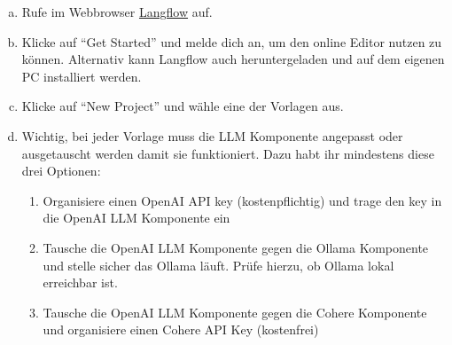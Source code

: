 \documentclass[12pt,ngerman]{AssignmentClass}
\begin{document}
\begin{enumerate}[a)]

\item Rufe im Webbrowser \href{https://www.langflow.org/}{Langflow} auf. 

\item Klicke auf “Get Started” und melde dich an, um den online Editor nutzen zu können. Alternativ kann Langflow auch heruntergeladen und auf dem eigenen PC installiert werden.    

\item Klicke auf “New Project” und wähle eine der Vorlagen aus. 

\item Wichtig, bei jeder Vorlage muss die LLM Komponente angepasst oder ausgetauscht werden damit sie funktioniert. Dazu habt ihr mindestens diese drei Optionen: 
\begin{enumerate}
    \item Organisiere einen OpenAI API key (kostenpflichtig) und trage den key in die OpenAI LLM Komponente ein
    \item Tausche die OpenAI LLM Komponente gegen die Ollama Komponente und stelle sicher das Ollama läuft. Prüfe hierzu, ob Ollama lokal erreichbar ist.  
 \item Tausche die OpenAI LLM Komponente gegen die Cohere Komponente und organisiere einen Cohere API Key (kostenfrei) 

\end{enumerate}
\end{enumerate}
\end{document}
